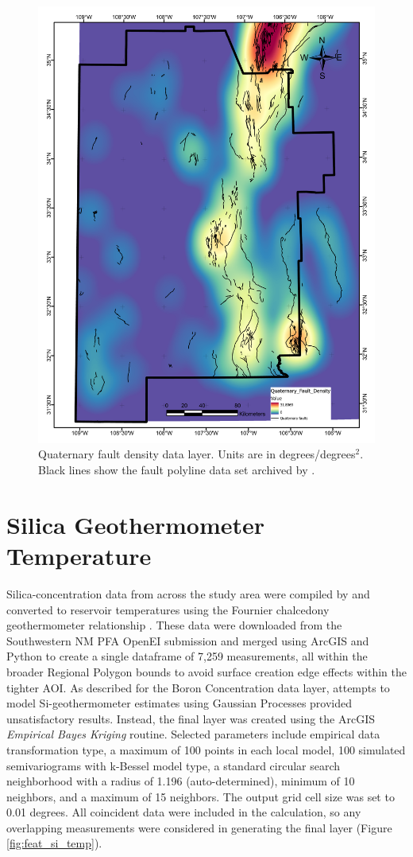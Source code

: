 \begin{figure}[H]
\centering
\includegraphics[width=0.75\linewidth]{templates/images/Figure-QFaultDensity.pdf}
\caption[Quaternary fault density data layer]{Quaternary fault density data layer. Units are in degrees/degrees$^2$. Black lines show the fault polyline data set archived by \protect\citet{bielicki_hydrogeolgic_2015}.}
\label{fig:feat_qfaults}
\end{figure}
\pagebreak

\section{Silica Geothermometer Temperature}\label{app:dl_geothermometer}
Silica-concentration data from across the study area were compiled by \citet{bielicki_hydrogeolgic_2015} and converted to reservoir temperatures using the Fournier chalcedony geothermometer relationship \citep{fournier_chemical_1977}. These data were downloaded from the Southwestern NM PFA OpenEI submission \citep{kelley_geothermal_2015} and merged using ArcGIS and Python to create a single dataframe of 7,259 measurements, all within the broader Regional Polygon bounds to avoid surface creation edge effects within the tighter AOI. As described for the Boron Concentration data layer, attempts to model Si-geothermometer estimates using Gaussian Processes provided unsatisfactory results. Instead, the final layer was created using the ArcGIS \textit{Empirical Bayes Kriging} routine. Selected parameters include empirical data transformation type, a maximum of 100 points in each local model, 100 simulated semivariograms with k-Bessel model type, a standard circular search neighborhood with a radius of 1.196 (auto-determined), minimum of 10 neighbors, and a maximum of 15 neighbors. The output grid cell size was set to 0.01 degrees. All coincident data were included in the calculation, so any overlapping measurements were considered in generating the final layer (Figure \ref{fig:feat_si_temp}).
\vfill
\pagebreak

